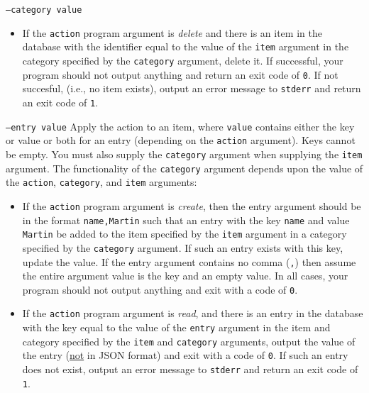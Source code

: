 \documentclass[a4paper]{article}
\begin{document}
\begin{labeling}{ \texttt{--category value} }
\begin{itemize}
        \item If the \texttt{action} program argument is \emph{delete} and there is an item in the database with the identifier equal to the value of the \texttt{item} argument in the category specified by the \texttt{category} argument, delete it. If successful, your program should not output anything and return an exit code of \texttt{0}. If not succesful, (i.e., no item exists), output an error message to \texttt{stderr} and return an exit code of \texttt{1}.
        \end{itemize}

    \item[\texttt{--entry value}]
    Apply the action to an item, where \texttt{value} contains either the key or value or both for an entry (depending on the \texttt{action} argument). Keys cannot be empty. You must also supply the \texttt{category} argument when supplying the \texttt{item} argument.  The functionality of the \texttt{category} argument depends upon the value of the \texttt{action}, \texttt{category}, and \texttt{item} arguments:
        \begin{itemize}
    
        \item If the \texttt{action} program argument is \emph{create}, then the entry argument should be in the format \texttt{name,Martin} such that an entry with the key \texttt{name} and value \texttt{Martin} be added to the item specified by the \texttt{item} argument in a category specified by the \texttt{category} argument. If such an entry exists with this key, update the value. If the entry argument contains no comma (\texttt{,}) then assume the entire argument value is the key and an empty value. In all cases, your program should not output anything and exit with a code of \texttt{0}.
    
        \item If the \texttt{action} program argument is \emph{read}, and there is an entry in the database with the key equal to the value of the \texttt{entry} argument in the item and category specified by the \texttt{item} and \texttt{category} arguments, output the value of the entry (\underline{not} in JSON format) and exit with a code of \texttt{0}. If such an entry does not exist, output an error message to \texttt{stderr} and return an exit code of \texttt{1}.
    

\end{itemize}
\end{labeling}
\end{document}
